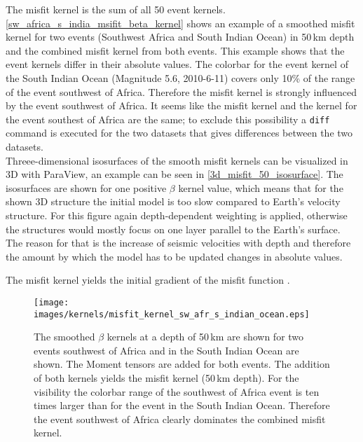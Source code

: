 The misfit kernel is the sum of all 50 event kernels. \autoref{sw_africa_s_india_msifit_beta_kernel} shows an example of a 
smoothed misfit kernel for two events (Southwest Africa and South Indian Ocean) in 50$\,$km depth 
and the combined misfit kernel from both events.
This example shows that the event kernels differ in their absolute values. 
The colorbar for the event kernel of the South Indian Ocean (Magnitude 5.6, 2010-6-11) covers only 10\% of 
the range of the event southwest of Africa.
Therefore the misfit kernel is strongly influenced by the event southwest of Africa.
It seems like the misfit kernel and the kernel for the event southest of Africa are the same;
to exclude this possibility a \texttt{diff} command is executed for the two datasets that gives 
differences between the two datasets.\\
%
Threee-dimensional isosurfaces of the smooth misfit kernels can be visualized in 3D with ParaView, 
an example can be seen in \autoref{3d_misfit_50_isosurface}.
The isosurfaces are shown for one positive $\beta$ kernel value, which means that for the shown 3D structure 
the initial model is too slow compared to Earth's velocity structure. 
For this figure again depth-dependent weighting is applied, 
otherwise the structures would mostly focus on one layer parallel to the Earth's surface.
The reason for that is the increase of seismic velocities with depth and therefore
the amount by which the model has to be updated changes in absolute values.

The misfit kernel yields the initial gradient of the misfit function \citep{Magnoni2012}.


\begin{figure}[h]
\begin{center}
\texttt{[image: images/kernels/misfit\_kernel\_sw\_afr\_s\_indian\_ocean.eps]}
\caption[Surface of a smooth misfit kernel for two events]
{The smoothed $\beta$ kernels at a depth of 50$\,$km are shown for two events southwest of Africa and 
in the South Indian Ocean are shown. The Moment tensors are added for both events.
The addition of both kernels yields the misfit kernel (50$\,$km depth).
For the visibility the colorbar range of the southwest of Africa event is ten times larger than for the event 
in the South Indian Ocean.
Therefore the event southwest of Africa clearly dominates the combined misfit kernel.}  
\label{sw_africa_s_india_msifit_beta_kernel}
\end{center}
\end{figure}


